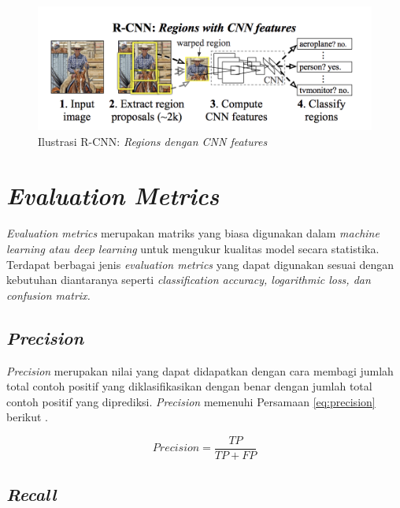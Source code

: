 \begin{figure}[H]
    \centering
    \includegraphics[scale=0.4]{gambar/rcnn.png}
    \caption{Ilustrasi R-CNN: \textit{Regions \textnormal{dengan} CNN features} \citep*{Girshick_2014_CVPR}}
    \label{fig:ilustrasircnn}
\end{figure}


\section{\textit{Evaluation Metrics}}
\label{sec:evaluationmetrics}

\textit{Evaluation metrics} merupakan matriks yang biasa digunakan dalam \textit{machine learning \textnormal{atau} deep learning} untuk mengukur kualitas model secara statistika. Terdapat berbagai jenis \textit{evaluation metrics} yang dapat digunakan sesuai dengan kebutuhan diantaranya seperti \textit{classification accuracy, logarithmic loss, \textnormal{dan} confusion matrix.}

\subsection{\textit{Precision}}
\label{subsec:precision}

\textit{Precision} merupakan nilai yang dapat didapatkan dengan cara membagi jumlah total contoh positif yang diklasifikasikan dengan benar dengan jumlah total contoh positif yang diprediksi. \textit{Precision} memenuhi Persamaan \ref*{eq:precision} berikut \citep*{hanafi2020deteksi}. \par

\begin{equation}
    \label{eq:precision}
    Precision=\frac{TP}{TP + FP}
\end{equation}

\subsection{\textit{Recall}}
\label{subsec:recall}


